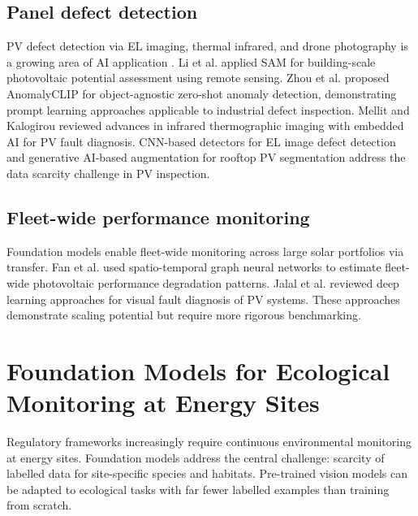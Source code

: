 \documentclass[preprint,12pt]{elsarticle}
\begin{document}
\subsection{Panel defect detection}
\label{subsec:solar_defect}

PV defect detection via EL imaging, thermal infrared, and drone photography is a growing area of AI application \cite{thakfan2024solar_panel_defect}. Li et al. \cite{li2024sam_solar_panel} applied SAM for building-scale photovoltaic potential assessment using remote sensing. Zhou et al. \cite{zhou2024anomalyclip} proposed AnomalyCLIP for object-agnostic zero-shot anomaly detection, demonstrating prompt learning approaches applicable to industrial defect inspection. Mellit and Kalogirou \cite{mellit2025thermal_ai_solar} reviewed advances in infrared thermographic imaging with embedded AI for PV fault diagnosis. CNN-based detectors for EL image defect detection \cite{liu2024cnn_el_detection} and generative AI-based augmentation for rooftop PV segmentation \cite{tan2024generative_pv_augment} address the data scarcity challenge in PV inspection.

\subsection{Fleet-wide performance monitoring}
\label{subsec:solar_fleet}

Foundation models enable fleet-wide monitoring across large solar portfolios via transfer. Fan et al. \cite{fan2024fleet_wide_pv} used spatio-temporal graph neural networks to estimate fleet-wide photovoltaic performance degradation patterns. Jalal et al. \cite{jalal2024dl_pv_faults} reviewed deep learning approaches for visual fault diagnosis of PV systems. These approaches demonstrate scaling potential but require more rigorous benchmarking.

\section{Foundation Models for Ecological Monitoring at Energy Sites}
\label{sec:ecological}

Regulatory frameworks increasingly require continuous environmental monitoring at energy sites. Foundation models address the central challenge: scarcity of labelled data for site-specific species and habitats. Pre-trained vision models can be adapted to ecological tasks with far fewer labelled examples than training from scratch.
\end{document}
